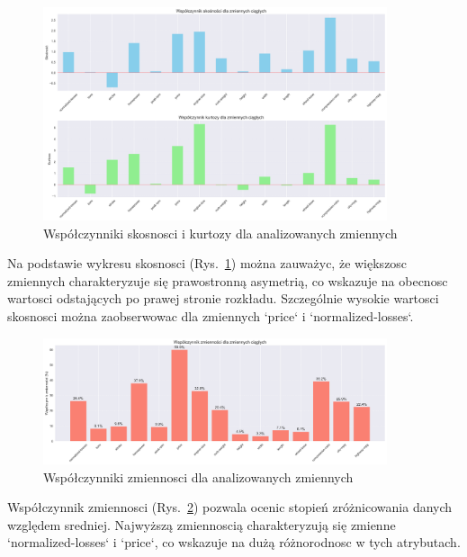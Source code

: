 \documentclass[12pt,a4paper]{article}
\begin{document}
\begin{figure}[H]
    \centering
    \includegraphics[width=0.9\textwidth]{figures/skosnosc_kurtoza.png}
    \caption{Współczynniki skosnosci i kurtozy dla analizowanych zmiennych}
    \label{fig:skosnosc_kurtoza}
\end{figure}

Na podstawie wykresu skosnosci (Rys.~\ref{fig:skosnosc_kurtoza}) można zauważyc, że większosc zmiennych charakteryzuje się prawostronną asymetrią, co wskazuje na obecnosc wartosci odstających po prawej stronie rozkładu. Szczególnie wysokie wartosci skosnosci można zaobserwowac dla zmiennych `price` i `normalized-losses`.

\begin{figure}[H]
    \centering
    \includegraphics[width=0.9\textwidth]{figures/wspolczynnik_zmiennosci.png}
    \caption{Współczynniki zmiennosci dla analizowanych zmiennych}
    \label{fig:wspolczynnik_zmiennosci}
\end{figure}

Współczynnik zmiennosci (Rys.~\ref{fig:wspolczynnik_zmiennosci}) pozwala ocenic stopień zróżnicowania danych względem sredniej. Najwyższą zmiennoscią charakteryzują się zmienne `normalized-losses` i `price`, co wskazuje na dużą różnorodnosc w tych atrybutach.
\end{document}
